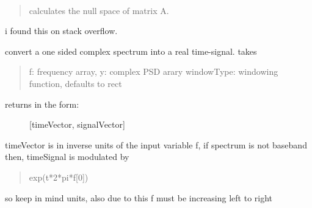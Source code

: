 \documentclass[letterpaper,10pt,english]{sphinxmanual}
\begin{document}

\begin{fulllineitems}
\label{api/mwavepy:mwavepy.mathFunctions.null}~\begin{quote}

calculates the null space of matrix A.
\end{quote}

i found this on stack overflow.

\end{fulllineitems}


\begin{fulllineitems}
\label{api/mwavepy:mwavepy.mathFunctions.psd2TimeDomain}
convert a one sided complex spectrum into a real time-signal.
takes
\begin{quote}

f: frequency array, 
y: complex PSD arary 
windowType: windowing function, defaults to rect
\end{quote}
\begin{description}
\item[{returns in the form:}] \leavevmode
{[}timeVector, signalVector{]}

\end{description}

timeVector is in inverse units of the input variable f,
if spectrum is not baseband then, timeSignal is modulated by
\begin{quote}

exp(t*2*pi*f{[}0{]})
\end{quote}

so keep in mind units, also due to this f must be increasing left to right

\end{fulllineitems}


\begin{fulllineitems}
\label{api/mwavepy:mwavepy.mathFunctions.radian_2_degree}
\end{fulllineitems}
\end{document}
